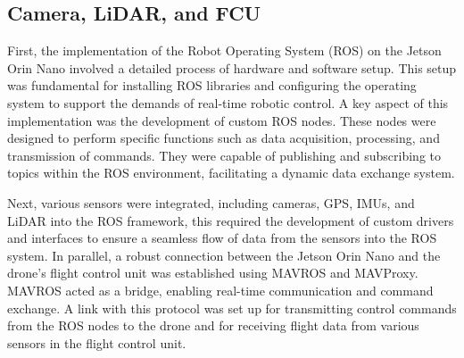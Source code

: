\subsection{Camera, LiDAR, and FCU}\label{subsection:D}

First, the implementation of the Robot Operating System (ROS) on the Jetson Orin Nano involved a detailed process of hardware and software setup. This setup was fundamental for installing ROS libraries and configuring the operating system to support the demands of real-time robotic control. A key aspect of this implementation was the development of custom ROS nodes. These nodes were designed to perform specific functions such as data acquisition, processing, and transmission of commands. They were capable of publishing and subscribing to topics within the ROS environment, facilitating a dynamic data exchange system.

Next, various sensors were integrated, including cameras, GPS, IMUs, and LiDAR into the ROS framework, this required the development of custom drivers and interfaces to ensure a seamless flow of data from the sensors into the ROS system. In parallel, a robust connection between the Jetson Orin Nano and the drone's flight control unit was established using MAVROS and MAVProxy. MAVROS acted as a bridge, enabling real-time communication and command exchange. A link with this protocol was set up for transmitting control commands from the ROS nodes to the drone and for receiving flight data from various sensors in the flight control unit.

